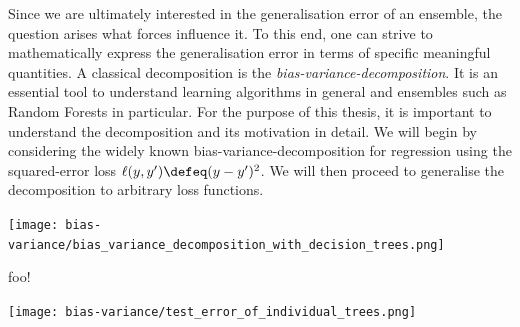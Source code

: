 \documentclass[
    a4paper, %
	fontsize=10pt, %
	twoside=false, %
]{kaobook}
\begin{document}
\begin{titlepage}
Since we are ultimately interested in the generalisation error of an ensemble, the question arises what forces influence it. To this end, one can strive to mathematically express the generalisation error in terms of specific meaningful quantities. A classical decomposition is the \textit{bias-variance-decomposition}. 
It is an essential tool to understand learning algorithms in general and ensembles such as Random Forests in particular. For the purpose of this thesis, it is important to understand the decomposition and its motivation in detail. 
We will begin by considering the widely known bias-variance-decomposition for regression using the squared-error loss $\ell(y, y') \defeq (y- y')^2$. We will then proceed to generalise the decomposition to arbitrary loss functions.

\begin{marginfigure} \label{fig:bias-variance-tradeoff}
    \texttt{[image: bias-variance/bias\_variance\_decomposition\_with\_decision\_trees.png]}
    \caption{foo!}
\end{marginfigure}


\begin{marginfigure} \label{fig:variance-trees}
    \texttt{[image: bias-variance/test\_error\_of\_individual\_trees.png]}
    \caption{
    Visualising the variance of \textcolor{blue}{Decision Tree} and \textcolor{orange}{Random Forest} models. Each glyph corresponds to the test error of one model trained on a random subset of the full available data. The variation of the test error around the mean test error across many dataset samples is exactly the variance.
    Not only do Random Forests show lower test errors on average, they seem to also have lower variance. We will explain this observation in \ref{todo}
    }
\end{marginfigure}


\end{titlepage}
\end{document}
